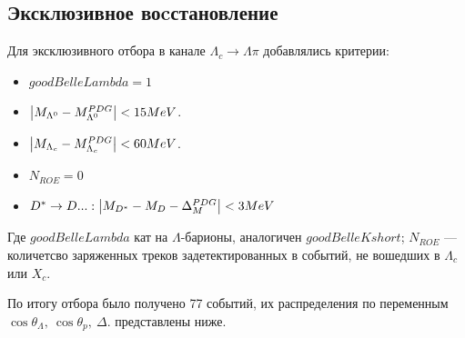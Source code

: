 \documentclass[a0,portrait]{a0poster}
\newcommand\tab[1][0.51cm]{\hspace*{#1}}
\begin{document}
\begin{mdframed}[style=MyFrame]
\begin{multicols}{2}
\section{Эксклюзивное воcстановление}

\tab Для эксклюзивного отбора в канале $\Lambda_c \to \Lambda \pi$ добавлялись критерии:

\begin{multicols}{2}
    \begin{itemize}
        \item $goodBelleLambda = 1$
        \item $\abs{M_{\Lambda^0} - M^{PDG}_{\Lambda^0}} < 15 MeV$.
        \item $\abs{M_{\Lambda_c} - M^{PDG}_{\Lambda_c}} < 60 MeV$.
        \item $N_{ROE} = 0$
        \item $D^*\to D ... : \abs{M_{D^*} - M_D - \Delta^{PDG}_M} < 3 MeV$
    \end{itemize}
\end{multicols}

Где $goodBelleLambda$ кат на $\Lambda$-барионы, аналогичен $goodBelleKshort$; 
$N_{ROE}$ --- количетсво заряженных треков задетектированных в событий, не 
вошедших в $\Lambda_c$ или $X_c$.

\vspace{0.5cm}

По итогу отбора было получено 77 событий, их распределения по переменным $\cos{\theta_\Lambda}, \ \cos{\theta_p}, \ \Delta$. представлены ниже.
{

}
\end{multicols}
\end{mdframed}
\end{document}
